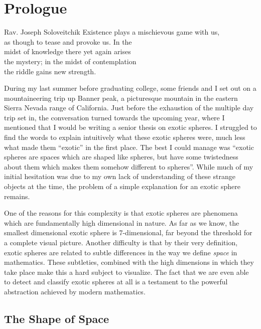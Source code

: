 \chapter*{Prologue}

\begin{epigraph}{19.5em}{Rav. Joseph Soloveitchik}
	Existence plays a mischievous game with us,\\
	as though to tease and provoke us. In the \\
	midst of knowledge there yet again arises \\
	the mystery; in the midst of contemplation\\
	the riddle gains new strength.
\end{epigraph}

During my last summer before graduating college, some friends and I set out on a mountaineering trip up Banner peak, a picturesque mountain in the eastern Sierra Nevada range of California. Just before the exhaustion of the multiple day trip set in, the conversation turned towards the upcoming year, where I mentioned that I would be writing a senior thesis on exotic spheres.
I struggled to find the words to explain intuitively what these exotic spheres were, much less what made them ``exotic'' in the first place.
The best I could manage was ``exotic spheres are spaces which are shaped like spheres, but have some twistedness about them which makes them somehow different to spheres''. 
While much of my initial hesitation was due to my own lack of understanding of these strange objects at the time, the problem of a simple explanation for an exotic sphere remains.

One of the reasons for this complexity is that exotic spheres are phenomena which are fundamentally high dimensional in nature. As far as we know, the smallest dimensional exotic sphere is 7-dimensional, far beyond the threshold for a complete visual picture. Another difficulty is that by their very definition, exotic spheres are related to subtle differences in the way we define \emph{space} in mathematics. These subtleties, combined with the high dimensions in which they take place make this a hard subject to visualize. The fact that we are even able to detect and classify exotic spheres at all is a testament to the powerful abstraction achieved by modern mathematics.

\section*{The Shape of Space}

